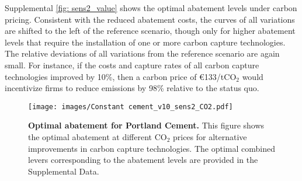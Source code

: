 \documentclass[12pt, a4paper]{article} %
\newcommand{\Suppl}{Supplemental}
\begin{document}
\Suppl$ $ \autoref{fig: sens2_value} shows the optimal abatement levels under carbon pricing. Consistent with the reduced abatement costs, the curves of all variations are shifted to the left of the reference scenario, though only for higher abatement levels that require the installation of one or more carbon capture technologies. The relative deviations of all variations from the reference scenario are again small. For instance, if the costs and capture rates of all carbon capture technologies improved by 10\%, then a carbon price of \euro 133/tCO$_2$ would incentivize firms to reduce emissions by 98\% relative to the status quo.

\begin{figure}[ht]
\centering
\texttt{[image: images/Constant cement\_v10\_sens2\_CO2.pdf]}
\caption{\textbf{Optimal abatement for Portland Cement.} This figure shows the optimal abatement at different CO$_2$ prices for alternative improvements in carbon capture technologies. The optimal combined levers corresponding to the abatement levels are provided in the \Suppl$ $ Data.}
\label{fig: sens2_value}
\end{figure}


\end{document}
